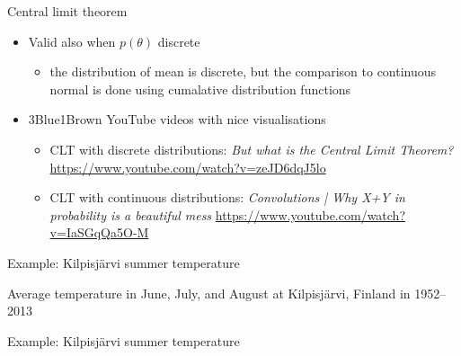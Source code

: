 \documentclass[english,t]{beamer}
\begin{document}
\begin{frame}{Central limit theorem}

  \begin{itemize}
  \item<+-> Valid also when $p(\theta)$ discrete
    \begin{itemize}
    \item the distribution of mean is discrete, but the comparison to
      continuous normal is done using cumalative distribution
      functions
    \end{itemize}
  \item<+-> 3Blue1Brown YouTube videos with nice visualisations
    \begin{itemize}
    \item CLT with discrete distributions: \textit{But what is the Central Limit Theorem?} \url{https://www.youtube.com/watch?v=zeJD6dqJ5lo}
    \item CLT with continuous distributions: \textit{Convolutions | Why X+Y in probability is a beautiful mess}  \url{https://www.youtube.com/watch?v=IaSGqQa5O-M}
    \end{itemize}
  \end{itemize}
\end{frame}

\begin{frame}{Example: Kilpisjärvi summer temperature}

  Average temperature in June, July, and August at Kilpisjärvi,
  Finland in 1952--2013

  \begin{center}
  \end{center}

\end{frame}

\begin{frame}{Example: Kilpisjärvi summer temperature}

  \begin{center}
  \end{center}

\end{frame}
\end{document}
